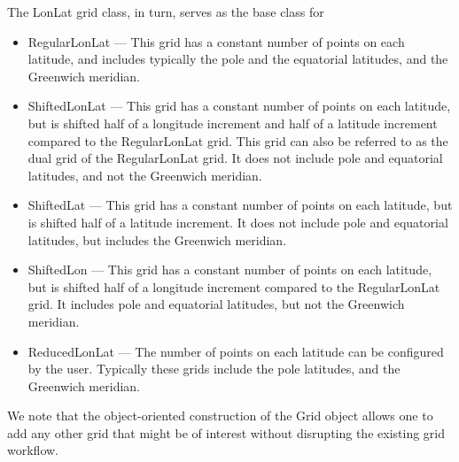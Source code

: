 The LonLat grid class, in turn, serves as the base class for 
\begin{itemize}
  \item RegularLonLat --- This grid has a constant number of points on each
        latitude, and includes typically the pole and the equatorial latitudes,
        and the Greenwich meridian.
  \item ShiftedLonLat --- This grid has a constant number of points on each
        latitude, but is shifted half of a longitude increment and half of a
        latitude increment compared to the RegularLonLat grid. This grid can
        also be referred to as the dual grid of the RegularLonLat grid. It does
        not include pole and equatorial latitudes, and not the Greenwich 
        meridian.
  \item ShiftedLat --- This grid has a constant number of points on each
        latitude, but is shifted half of a latitude increment. It does
        not include pole and equatorial latitudes, but includes the Greenwich
        meridian.
  \item ShiftedLon --- This grid has a constant number of points on each
        latitude, but is shifted half of a longitude increment compared to the
        RegularLonLat grid. It includes pole and equatorial latitudes, but not 
        the Greenwich meridian.
  \item ReducedLonLat --- The number of points on each latitude can be 
        configured by the user. Typically these grids include the pole
        latitudes, and the Greenwich meridian.
\end{itemize}

We note that the object-oriented construction of the Grid 
object allows one to add any other grid that might be of 
interest without disrupting the existing grid workflow.


